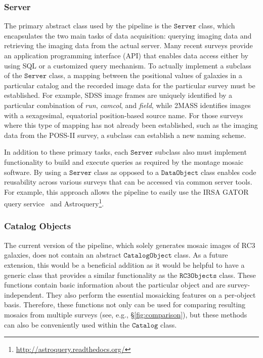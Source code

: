 \documentclass[authoryear, 12pt, 5p, times]{elsarticle}
\begin{document}
\subsubsection{Server\label{sec:server}}

The primary abstract class used by the pipeline is the $\texttt{Server}$ class, which encapsulates the two main tasks of data acquisition: querying imaging data and retrieving the imaging data from the actual server. Many recent surveys provide an application programming interface (API) that enables data access either by using SQL or a customized query mechanism. To actually implement a subclass of the $\texttt{Server}$ class, a mapping between the positional values of galaxies in a particular catalog and the recorded image data for the particular survey must be established. For example, SDSS image frames are uniquely identified by a particular combination of \textit{run}, \textit{camcol}, and \textit{field}, while 2MASS identifies images with a sexagesimal, equatorial position-based source name. For those surveys where this type of mapping has not already been established, such as the imaging data from the POSS-II survey, a subclass can establish a new naming scheme.

In addition to these primary tasks, each $\texttt{Server}$ subclass also must implement functionality to build and execute queries as required by the montage mosaic software. By using a $\texttt{Server}$ class as opposed to a $\texttt{DataObject}$ class enables code reusability across various surveys that can be accessed via common server tools. For example, this approach allows the pipeline to easily use the IRSA GATOR query service~\citep{irsa} and Astroquery\footnote{\url{http://astroquery.readthedocs.org/}}.

\subsubsection{Catalog Objects}

The current version of the pipeline, which solely generates mosaic images of RC3 galaxies, does not contain an abstract $\texttt{CatalogObject}$ class. As a future extension, this would be a beneficial addition as it would be helpful to have a generic class that provides a similar functionality as the $\texttt{RC3Objects}$ class. These functions contain basic information about the particular object and are survey-independent. They also perform the essential mosaicking features on a per-object basis. Therefore, these functions not only can be used for comparing resulting mosaics from multiple surveys (see, e.g., \S\ref{fig:comparison}), but these methods can also be conveniently used within the $\texttt{Catalog}$ class. 
\end{document}
